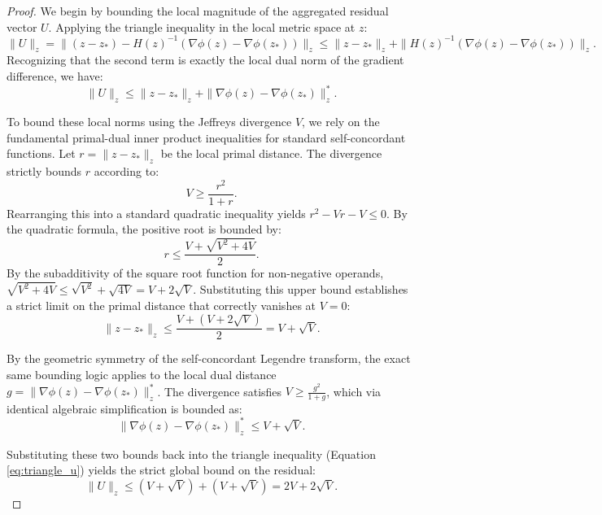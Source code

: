 \begin{proof}
We begin by bounding the local magnitude of the aggregated residual vector $U$. Applying the triangle inequality in the local metric space at $z$:
\begin{equation}
    \|U\|_z = \| (z - z_*) - H(z)^{-1}(\nabla \phi(z) - \nabla \phi(z_*)) \|_z \le \|z - z_*\|_z + \|H(z)^{-1}(\nabla \phi(z) - \nabla \phi(z_*))\|_z.
\end{equation}
Recognizing that the second term is exactly the local dual norm of the gradient difference, we have:
\begin{equation} \label{eq:triangle_u}
    \|U\|_z \le \|z - z_*\|_z + \|\nabla \phi(z) - \nabla \phi(z_*)\|^*_z.
\end{equation}

To bound these local norms using the Jeffreys divergence $V$, we rely on the fundamental primal-dual inner product inequalities for standard self-concordant functions. Let $r = \|z - z_*\|_z$ be the local primal distance. The divergence strictly bounds $r$ according to:
\begin{equation}
    V \ge \frac{r^2}{1 + r}.
\end{equation}
Rearranging this into a standard quadratic inequality yields $r^2 - V r - V \le 0$. By the quadratic formula, the positive root is bounded by:
\begin{equation}
    r \le \frac{V + \sqrt{V^2 + 4V}}{2}.
\end{equation}
By the subadditivity of the square root function for non-negative operands, $\sqrt{V^2 + 4V} \le \sqrt{V^2} + \sqrt{4V} = V + 2\sqrt{V}$. Substituting this upper bound establishes a strict limit on the primal distance that correctly vanishes at $V=0$:
\begin{equation}
    \|z - z_*\|_z \le \frac{V + (V + 2\sqrt{V})}{2} = V + \sqrt{V}.
\end{equation}

By the geometric symmetry of the self-concordant Legendre transform, the exact same bounding logic applies to the local dual distance $g = \|\nabla \phi(z) - \nabla \phi(z_*)\|^*_z$. The divergence satisfies $V \ge \frac{g^2}{1 + g}$, which via identical algebraic simplification is bounded as:
\begin{equation}
    \|\nabla \phi(z) - \nabla \phi(z_*)\|^*_z \le V + \sqrt{V}.
\end{equation}

Substituting these two bounds back into the triangle inequality (Equation \ref{eq:triangle_u}) yields the strict global bound on the residual:
\begin{equation} \label{eq:u_bound_final}
    \|U\|_z \le (V + \sqrt{V}) + (V + \sqrt{V}) = 2V + 2\sqrt{V}.
\end{equation}


\end{proof}
